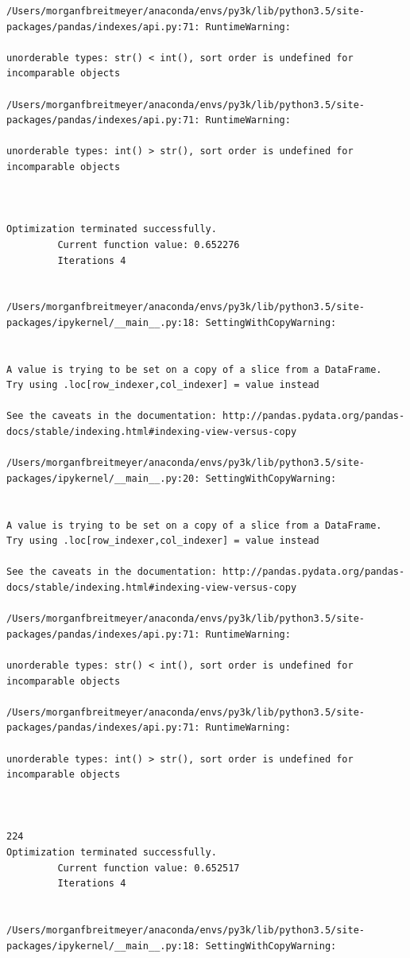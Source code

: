 \begin{lstlisting}
/Users/morganfbreitmeyer/anaconda/envs/py3k/lib/python3.5/site-packages/pandas/indexes/api.py:71: RuntimeWarning:

unorderable types: str() < int(), sort order is undefined for incomparable objects

/Users/morganfbreitmeyer/anaconda/envs/py3k/lib/python3.5/site-packages/pandas/indexes/api.py:71: RuntimeWarning:

unorderable types: int() > str(), sort order is undefined for incomparable objects



Optimization terminated successfully.
         Current function value: 0.652276
         Iterations 4


/Users/morganfbreitmeyer/anaconda/envs/py3k/lib/python3.5/site-packages/ipykernel/__main__.py:18: SettingWithCopyWarning:


A value is trying to be set on a copy of a slice from a DataFrame.
Try using .loc[row_indexer,col_indexer] = value instead

See the caveats in the documentation: http://pandas.pydata.org/pandas-docs/stable/indexing.html#indexing-view-versus-copy

/Users/morganfbreitmeyer/anaconda/envs/py3k/lib/python3.5/site-packages/ipykernel/__main__.py:20: SettingWithCopyWarning:


A value is trying to be set on a copy of a slice from a DataFrame.
Try using .loc[row_indexer,col_indexer] = value instead

See the caveats in the documentation: http://pandas.pydata.org/pandas-docs/stable/indexing.html#indexing-view-versus-copy

/Users/morganfbreitmeyer/anaconda/envs/py3k/lib/python3.5/site-packages/pandas/indexes/api.py:71: RuntimeWarning:

unorderable types: str() < int(), sort order is undefined for incomparable objects

/Users/morganfbreitmeyer/anaconda/envs/py3k/lib/python3.5/site-packages/pandas/indexes/api.py:71: RuntimeWarning:

unorderable types: int() > str(), sort order is undefined for incomparable objects



224
Optimization terminated successfully.
         Current function value: 0.652517
         Iterations 4


/Users/morganfbreitmeyer/anaconda/envs/py3k/lib/python3.5/site-packages/ipykernel/__main__.py:18: SettingWithCopyWarning:



\end{lstlisting}
